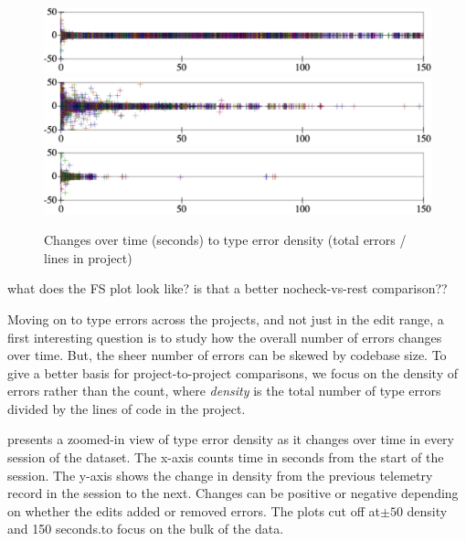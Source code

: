 \documentclass[english,submission,cleveref]{programming}
\begin{document}
\begin{figure}[t]\centering

  \mnocheck{}
  \includegraphics[width=\columnwidth]{img/error-count-nocheck-row--te-density-diff.pdf}
  \medskip
  \mnonstrict{}
  \includegraphics[width=\columnwidth]{img/error-count-nonstrict-row--te-density-diff.pdf}
  \medskip
  \mstrict{}
  \includegraphics[width=\columnwidth]{img/error-count-strict-row--te-density-diff.pdf}
  \caption{Changes over time (seconds) to type error density (total errors / lines in project)}
  \label{f:error-density}
\end{figure}

\FILL{} what does the FS plot look like? is that a better nocheck-vs-rest comparison??

Moving on to type errors across the projects, and not just in the edit range,
a first interesting question is to study how the overall number of errors
changes over time.
But, the sheer number of errors can be skewed by codebase size.
To give a better basis for project-to-project comparisons, we focus
on the density of errors rather than the count, where \emph{density} is
the total number of type errors divided by the lines of code in the project.

 presents a zoomed-in view of type error density as it
changes over time in every session of the dataset.
The x-axis counts time in seconds from the start of the session.
The y-axis shows the change in density from the previous telemetry record
in the session to the next.
Changes can be positive or negative depending on whether the edits added
or removed errors.
The plots cut off at$\pm{}50$ density and 150 seconds.to focus on the
bulk of the data.
\end{document}
